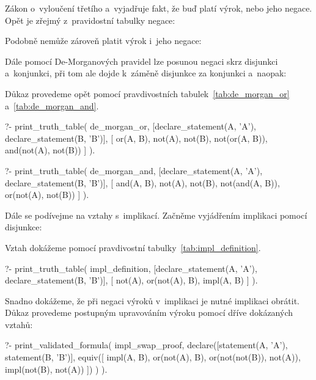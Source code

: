 Zákon o~vyloučení třetího a~vyjadřuje fakt, že buď platí výrok, nebo jeho negace. Opět je zřejmý z~pravidostní tabulky negace:


Podobně nemůže zároveň platit výrok i~jeho negace: 


Dále pomocí De-Morganových pravidel lze posunou negaci skrz disjunkci a~konjunkci, při tom ale dojde k~záměně disjunkce za konjunkci a~naopak:


Důkaz provedeme opět pomocí pravdivostních tabulek~\ref{tab:de_morgan_or} a~\ref{tab:de_morgan_and}.

\begin{prolog}
?- print_truth_table(
	de_morgan_or,
	[declare_statement(A, 'A'), declare_statement(B, 'B')],
	[
		or(A, B),
		not(A),
		not(B),
		not(or(A, B)),
		and(not(A), not(B))
	]
).
\end{prolog}

\begin{prolog}
?- print_truth_table(
	de_morgan_and,
	[declare_statement(A, 'A'), declare_statement(B, 'B')],
	[
		and(A, B),
		not(A),
		not(B),
		not(and(A, B)),
		or(not(A), not(B))
	]
).
\end{prolog}

Dále se podívejme na vztahy s~implikací. Začněme vyjádřením implikaci pomocí disjunkce:


Vztah dokážeme pomocí pravdivostní tabulky~\ref{tab:impl_definition}.

\begin{prolog}
?- print_truth_table(
	impl_definition,
	[declare_statement(A, 'A'), declare_statement(B, 'B')],
	[
		not(A),
		or(not(A), B),
		impl(A, B)
	]
).
\end{prolog}

Snadno dokážeme, že při negaci výroků v~implikaci je nutné implikaci obrátit. Důkaz provedeme postupným upravováním výroku pomocí dříve dokázaných vztahů:

\begin{prolog}
?- print_validated_formula(
	impl_swap_proof,
	declare([statement(A, 'A'), statement(B, 'B')],
		equiv([
			impl(A, B),
			or(not(A), B),
			or(not(not(B)), not(A)),
			impl(not(B), not(A))
		])
	)
).
\end{prolog}


